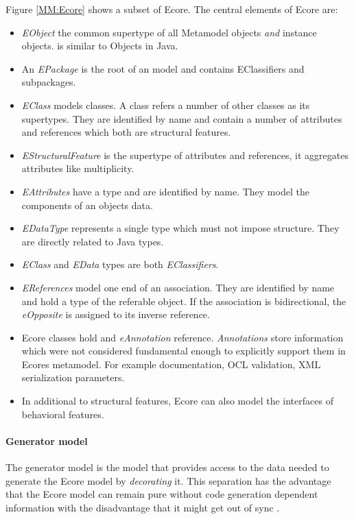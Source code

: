 Figure \ref{MM:Ecore} shows a subset of Ecore.  The central elements of Ecore are:\\
\begin{itemize}
	\item \emph{EObject} the common supertype of all Metamodel objects \emph{and} instance objects.  is similar to Objects in Java.
	\item An \emph{EPackage} is the root of an model and contains EClassifiers and subpackages.
	\item \emph{EClass} models classes. A class refers a number of other classes as its supertypes. They are identified by name and contain a number of attributes and references which both are structural features.
	\item \emph{EStructuralFeature} is the supertype of attributes and references, it aggregates attributes like multiplicity.
	\item \emph{EAttributes} have a type and are identified by name. They model the components of an objects data.
	\item \emph{EDataType} represents a single type which must not impose structure. They are directly related to Java types.
	\item \emph{EClass} and \emph{EData} types are both \emph{EClassifiers}.
	\item \emph{EReferences} model one end of an association. They are identified by name and hold a type of the referable object. If the association is bidirectional, the \emph{eOpposite} is assigned to its inverse reference. \cite{EMF2nd}
	\item Ecore classes hold and \emph{eAnnotation} reference. \emph{Annotations} store information which were not considered fundamental enough to explicitly support them in Ecores metamodel. For example documentation, OCL validation, XML serialization parameters. \cite{EMP}
	\item In additional to structural features, Ecore can also model the interfaces of behavioral features.
\end{itemize}

\paragraph{Generator model}
The generator model is the model that provides access to the data needed to generate the Ecore model by \emph{decorating} it. This separation has the advantage that the Ecore model can remain pure without code generation dependent information with the disadvantage that it might get out of sync \cite{EMF2nd}.


